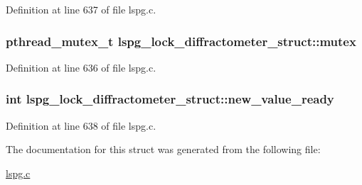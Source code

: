 Definition at line 637 of file lspg.\-c.

\hypertarget{structlspg__lock__diffractometer__struct_a362e848dfd1551428b8d12d8776fd2ed}{
\subsubsection[{mutex}]{\setlength{\rightskip}{0pt plus 5cm}pthread\-\_\-mutex\-\_\-t lspg\-\_\-lock\-\_\-diffractometer\-\_\-struct\-::mutex}}\label{structlspg__lock__diffractometer__struct_a362e848dfd1551428b8d12d8776fd2ed}


Definition at line 636 of file lspg.\-c.

\hypertarget{structlspg__lock__diffractometer__struct_ae94acdf44008ce48930e3083f08f5b6c}{
\subsubsection[{new\-\_\-value\-\_\-ready}]{\setlength{\rightskip}{0pt plus 5cm}int lspg\-\_\-lock\-\_\-diffractometer\-\_\-struct\-::new\-\_\-value\-\_\-ready}}\label{structlspg__lock__diffractometer__struct_ae94acdf44008ce48930e3083f08f5b6c}


Definition at line 638 of file lspg.\-c.



The documentation for this struct was generated from the following file\-:\begin{DoxyCompactItemize}
\item 
\hyperlink{lspg_8c}{lspg.\-c}\end{DoxyCompactItemize}
